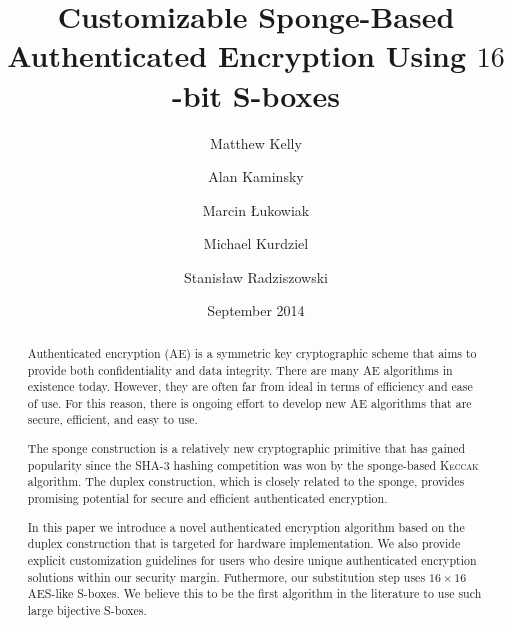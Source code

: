 \documentclass[11pt,american]{article}
\title{Customizable Sponge-Based Authenticated Encryption Using $16$-bit S-boxes}
\author[1]{Matthew Kelly}
\author[2]{Alan Kaminsky}
\author[1]{Marcin {\L}ukowiak}
\author[3]{\authorcr Michael Kurdziel}
\author[2]{Stanis{\l}aw Radziszowski}
\affil[1]{\footnotesize Department of Computer Engineering, Rochester Institute of Technology}
\affil[2]{Department of Computer Science, Rochester Institute of Technology}
\affil[3]{Harris Corporation, Rochester, NY}
\date{September 2014}
\newcommand{\TODO}{\textcolor{red}{\textbf{TODO}}\xspace}
\newcommand{\Keccak}{\textsc{Keccak}\xspace}
\begin{document}
\maketitle

\begin{abstract}
Authenticated encryption (AE) is a symmetric key cryptographic scheme that aims to provide both confidentiality and data integrity. 
There are many AE algorithms in existence today.
However, they are often far from ideal in terms of efficiency and ease of use.
For this reason, there is ongoing effort to develop new AE algorithms that are secure, efficient, and easy to use.

The sponge construction is a relatively new cryptographic primitive that has gained popularity since the SHA-3 hashing competition was won by the sponge-based \Keccak algorithm.
The duplex construction, which is closely related to the sponge, provides promising potential for secure and efficient authenticated encryption.

In this paper we introduce a novel authenticated encryption algorithm based on the duplex construction that is targeted for hardware implementation.
We also provide explicit customization guidelines for users who desire unique authenticated encryption solutions within our security margin.
Futhermore, our substitution step uses $16 \times 16$ AES-like S-boxes.
We believe this to be the first algorithm in the literature to use such large bijective S-boxes.
\end{abstract}







\linespread{1}
\selectfont



\appendix
\newpage


\end{document}
